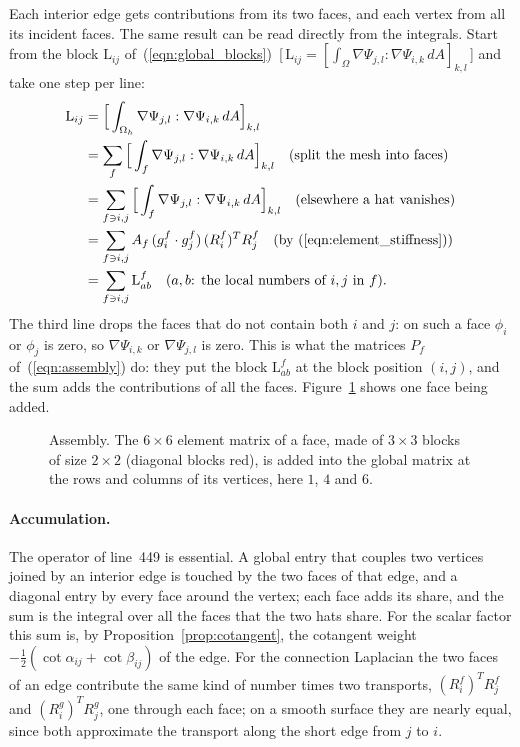 Each interior edge gets contributions from its two faces, and each vertex from all its incident faces. The same result can be read directly from the integrals. Start from the block $\mathrm L_{ij}$ of~(\ref{eqn:global_blocks})~[\,$\mathrm L_{ij} = [\int_\Omega \nabla \Psi_{j,l} : \nabla \Psi_{i,k}\, dA]_{k,l}$\,] and take one step per line:
\begin{align*}
\mathrm L_{ij} &= \Big[ \int_{\Omega_h} \nabla \Psi_{j,l} : \nabla \Psi_{i,k}\, dA \Big]_{k,l} \\
&= \sum_f \Big[ \int_f \nabla \Psi_{j,l} : \nabla \Psi_{i,k}\, dA \Big]_{k,l} \quad \text{(split the mesh into faces)}\\
&= \sum_{f \ni i, j} \Big[ \int_f \nabla \Psi_{j,l} : \nabla \Psi_{i,k}\, dA \Big]_{k,l} \quad \text{(elsewhere a hat vanishes)}\\
&= \sum_{f \ni i, j} A_f\, (g_i^f\cdot g_j^f)\, (R_i^f)^TR_j^f \quad \text{(by~(\ref{eqn:element_stiffness}))}\\
&= \sum_{f\ni i,j} \mathrm L^f_{ab} \quad \text{($a, b$: the local numbers of $i, j$ in $f$)} .
\end{align*}
The third line drops the faces that do not contain both $i$ and $j$: on such a face $\phi_i$ or $\phi_j$ is zero, so $\nabla\Psi_{i,k}$ or $\nabla\Psi_{j,l}$ is zero. This is what the matrices $P_f$ of~(\ref{eqn:assembly}) do: they put the block $\mathrm L^f_{ab}$ at the block position $(i, j)$, and the sum adds the contributions of all the faces. Figure~\ref{fig:assembly} shows one face being added.
\begin{figure}[t]
\centering
{}
\caption{Assembly. The $6 \times 6$ element matrix of a face, made of $3 \times 3$ blocks of size $2 \times 2$ (diagonal blocks red), is added into the global matrix at the rows and columns of its vertices, here $1$, $4$ and $6$.}
\label{fig:assembly}
\end{figure}

\paragraph{Accumulation.} The operator \code{+=} of line~449 is essential. A global entry that couples two vertices joined by an interior edge is touched by the two faces of that edge, and a diagonal entry by every face around the vertex; each face adds its share, and the sum is the integral over all the faces that the two hats share. For the scalar factor this sum is, by Proposition~\ref{prop:cotangent}, the cotangent weight $-\frac12(\cot\alpha_{ij} + \cot\beta_{ij})$ of the edge. For the connection Laplacian the two faces of an edge contribute the same kind of number times two transports, $(R_i^f)^TR_j^f$ and $(R_i^g)^TR_j^g$, one through each face; on a smooth surface they are nearly equal, since both approximate the transport along the short edge from $j$ to $i$.

